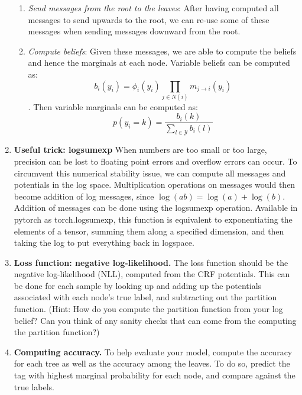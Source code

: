 \documentclass[11pt,addpoints,answers]{exam}
\numberwithin{equation}{section} %
\numberwithin{figure}{section} %
\numberwithin{table}{section} %
\newcommand{\Nc}{\mathcal{N}}
\newcommand{\Yc}{\mathcal{Y}}
\newcommand{\yv}{\mathbf{y}}
\begin{document}
\begin{enumerate}
\begin{enumerate}
        
        
        
        \item \emph{Send messages from the root to the leaves}: After having computed all messages to send upwards to the root, we can re-use some of these messages when sending messages downward from the root.  
        \item \emph{Compute beliefs}: Given these messages, we are able to compute the beliefs and hence the marginals at each node.
        Variable beliefs can be computed as:
    $$b_i(y_i) = \phi_i(y_i) \prod_{j \in N(i)} m_{j \rightarrow i}(y_i)$$.
    Then variable marginals can be computed as:
    $$p(y_i = k) = \frac{b_i(k)}{\sum_{l \in \Yc} b_i(l)}$$
    \end{enumerate}

    \item \textbf{Useful trick: logsumexp} When numbers are too small or too large, precision can be lost to floating point errors and overflow errors can occur. To circumvent this numerical stability issue, we can compute all messages and potentials in the log space. Multiplication operations on messages would then become addition of log messages, since $\log(ab) = \log(a) + \log(b)$. Addition of messages can be done using the logsumexp operation. Available in pytorch as torch.logsumexp, this function is equivalent to exponentiating the elements of a tensor, summing them along a specified dimension, and then taking the log to put everything back in logspace.
    
    \item \textbf{Loss function: negative log-likelihood.} The loss function should be the negative log-likelihood (NLL), computed from the CRF potentials. This can be done for each sample by looking up and adding up the potentials associated with each node's true label, and subtracting out the partition function. (Hint: How do you compute the partition function from your log belief? Can you think of any sanity checks that can come from the computing the partition function?) 
    
    \item \textbf{Computing accuracy.} To help evaluate your model, compute the accuracy for each tree as well as the accuracy among the leaves. To do so, predict the tag with highest marginal probability for each node, and compare against the true labels. 
\end{enumerate}
\end{document}
